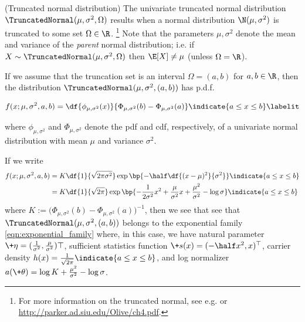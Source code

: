 \documentclass{article} %
\newcommand{\sufficientStatsFunction}{\+s}
\newcommand{\carrierDensity}{h}
\newcommand{\param}{\+\theta}
\newcommand{\naturalParam}{\+\eta}
\begin{document}
\begin{example}{(Truncated normal distribution)} 
\label{ex:truncated_normal_as_ef} The univariate truncated normal distribution $\TruncatedNormal(\mu,  \sigma^2,  \Omega)$ results when a normal distribution $\N(\mu,  \sigma^2)$ is truncated to some set $\Omega \in \R$. \footnote{For more information on the truncated normal,  see e.g.  \cite{burkardt2014truncated} or \url{http://parker.ad.siu.edu/Olive/ch4.pdf}.}   Note that the parameters $\mu, \sigma^2$ denote the mean and variance of the \textit{parent} normal distribution;  i.e.  if $X \sim \TruncatedNormal(\mu,  \sigma^2,  \Omega)$ then $\E[X] \neq \mu$ (unless $\Omega = \R$). 

If we assume that the truncation set is an interval $\Omega = (a,b)$ for $a,b \in \R$,  then the distribution $\TruncatedNormal(\mu,  \sigma^2,  (a,b))$ has p.d.f.

\begin{align*}
f(x ; \mu,  \sigma^2,  a,  b) = \df{\phi_{\mu, \sigma^2} (x) }{\Phi_{\mu, \sigma^2} (b)  - \Phi_{\mu, \sigma^2} (a) } \indicate{a \leq x \leq b} \labelit \label{eqn:pdf_of_normal_truncated_to_an_interval}
\end{align*} 

where $\phi_{\mu,  \sigma^2}$ and $\Phi_{\mu,  \sigma^2}$ denote the pdf and cdf,  respectively,  of a univariate normal distribution with mean $\mu$ and variance $\sigma^2$.   

If we write
\begin{align*}
f(x ; \mu,  \sigma^2,  a,  b) & = K \df{1}{\sqrt{2 \pi \sigma^2}} \exp \bp{-\half \df{(x-\mu)^2}{\sigma^2}}  \indicate{a \leq x \leq b} \\
& = K \df{1}{\sqrt{2 \pi}} \exp \bp{ - \frac{1}{2 \sigma^2} x^2 + \frac{\mu}{\sigma^2} x  + \frac{\mu^2}{\sigma^2}  - \log \sigma}  \indicate{a \leq x \leq b} 
\end{align*} 
where $K := \big( \Phi_{\mu, \sigma^2} (b)  - \Phi_{\mu, \sigma^2} (a) \big)^{-1}$,  then we see that see that  $\TruncatedNormal(\mu,  \sigma^2,  (a,b))$ belongs to the exponential family \eqref{eqn:exponential_family} where,  in this case,  we have natural parameter $\naturalParam = (\frac{1}{\sigma^2},  \frac{\mu}{\sigma^2})\top$,  sufficient statistics function $\sufficientStatsFunction(x) = (-\half x^2,  x)^\top$,  carrier density $\carrierDensity(x) =  \frac{1}{\sqrt{2 \pi}}  \indicate{a \leq x \leq b}$,  and log normalizer $a(\param) = \log K + \frac{\mu^2}{\sigma^2} - \log \sigma$.
 
\end{example}
\end{document}
